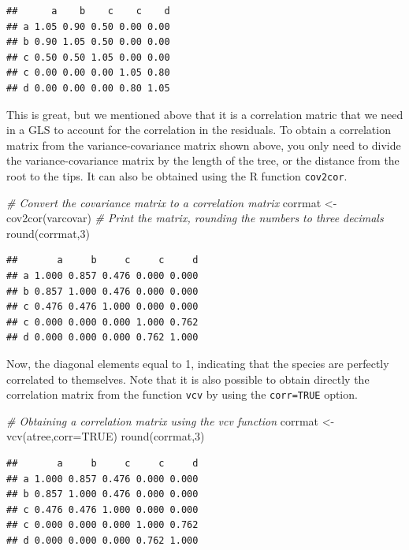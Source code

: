 \documentclass[
]{book}
\newenvironment{Shaded}{\begin{snugshade}}{\end{snugshade}}
\newcommand{\AttributeTok}[1]{\textcolor[rgb]{0.77,0.63,0.00}{#1}}
\newcommand{\CommentTok}[1]{\textcolor[rgb]{0.56,0.35,0.01}{\textit{#1}}}
\newcommand{\ConstantTok}[1]{\textcolor[rgb]{0.00,0.00,0.00}{#1}}
\newcommand{\DecValTok}[1]{\textcolor[rgb]{0.00,0.00,0.81}{#1}}
\newcommand{\FunctionTok}[1]{\textcolor[rgb]{0.00,0.00,0.00}{#1}}
\newcommand{\NormalTok}[1]{#1}
\newcommand{\OtherTok}[1]{\textcolor[rgb]{0.56,0.35,0.01}{#1}}
\begin{document}
\begin{verbatim}
##      a    b    c    c    d
## a 1.05 0.90 0.50 0.00 0.00
## b 0.90 1.05 0.50 0.00 0.00
## c 0.50 0.50 1.05 0.00 0.00
## c 0.00 0.00 0.00 1.05 0.80
## d 0.00 0.00 0.00 0.80 1.05
\end{verbatim}

This is great, but we mentioned above that it is a correlation matric that we need in a GLS to account for the correlation in the residuals. To obtain a correlation matrix from the variance-covariance matrix shown above, you only need to divide the variance-covariance matrix by the length of the tree, or the distance from the root to the tips. It can also be obtained using the R function \texttt{cov2cor}.

\begin{Shaded}
\begin{Highlighting}[]
\CommentTok{\# Convert the covariance matrix to a correlation matrix}
\NormalTok{corrmat }\OtherTok{\textless{}{-}} \FunctionTok{cov2cor}\NormalTok{(varcovar)}
\CommentTok{\# Print the matrix, rounding the numbers to three decimals}
\FunctionTok{round}\NormalTok{(corrmat,}\DecValTok{3}\NormalTok{)}
\end{Highlighting}
\end{Shaded}

\begin{verbatim}
##       a     b     c     c     d
## a 1.000 0.857 0.476 0.000 0.000
## b 0.857 1.000 0.476 0.000 0.000
## c 0.476 0.476 1.000 0.000 0.000
## c 0.000 0.000 0.000 1.000 0.762
## d 0.000 0.000 0.000 0.762 1.000
\end{verbatim}

Now, the diagonal elements equal to 1, indicating that the species are perfectly correlated to themselves. Note that it is also possible to obtain directly the correlation matrix from the function \texttt{vcv} by using the \texttt{corr=TRUE} option.

\begin{Shaded}
\begin{Highlighting}[]
\CommentTok{\# Obtaining a correlation matrix using the \textquotesingle{}vcv\textquotesingle{} function}
\NormalTok{corrmat }\OtherTok{\textless{}{-}} \FunctionTok{vcv}\NormalTok{(atree,}\AttributeTok{corr=}\ConstantTok{TRUE}\NormalTok{)}
\FunctionTok{round}\NormalTok{(corrmat,}\DecValTok{3}\NormalTok{)}
\end{Highlighting}
\end{Shaded}

\begin{verbatim}
##       a     b     c     c     d
## a 1.000 0.857 0.476 0.000 0.000
## b 0.857 1.000 0.476 0.000 0.000
## c 0.476 0.476 1.000 0.000 0.000
## c 0.000 0.000 0.000 1.000 0.762
## d 0.000 0.000 0.000 0.762 1.000
\end{verbatim}
\end{document}
